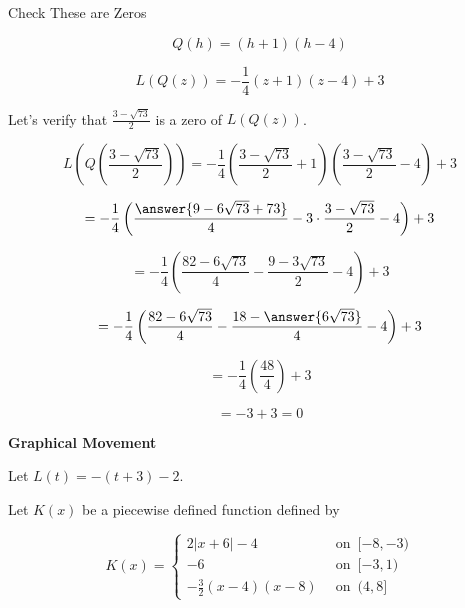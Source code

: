 \documentclass{ximera}
\begin{document}
\begin{claim} Check These are Zeros


\[   Q(h) = (h+1)(h-4)   \]


\[   L(Q(z)) = -\frac{1}{4} (z+1)(z-4) + 3   \]


Let's verify that $\frac{3 - \sqrt{73}}{2}$ is a zero of $L(Q(z))$.



\[   L \left( Q \left( \frac{3 - \sqrt{73}}{2} \right) \right) = -\frac{1}{4} \left( \frac{3 - \sqrt{73}}{2}+1 \right) \left( \frac{3 - \sqrt{73}}{2}-4 \right) + 3    \]



\[  = -\frac{1}{4} \left( \frac{\answer{9 - 6 \sqrt{73} + 73}}{4} - 3 \cdot \frac{3 - \sqrt{73}}{2} - 4 \right) + 3    \]


\[  = -\frac{1}{4} \left( \frac{82 - 6 \sqrt{73}}{4} - \frac{9 - 3 \sqrt{73}}{2} - 4 \right) + 3    \]


\[  = -\frac{1}{4} \left( \frac{82 - 6 \sqrt{73}}{4} - \frac{18 - \answer{6 \sqrt{73}}}{4} - 4 \right) + 3    \]


\[  = -\frac{1}{4} \left( \frac{48}{4} \right) + 3    \]


\[  = -3 + 3   = 0 \]


\end{claim}


































\textbf{\textcolor{blue!55!black}{Graphical Movement}} 








Let $L(t) = -(t+3) - 2$.


Let $K(x)$ be a piecewise defined function defined by 


\[
K(x) = 
\begin{cases}
  2|x+6| - 4         &    \,     \text{ on } \,   [-8,-3)    \\
  -6               &    \,     \text{ on } \,    [-3,1)      \\
  -\frac{3}{2}(x-4)(x-8)    &   \,     \text{ on } \,    (4,8]
\end{cases}
\]
\end{document}
